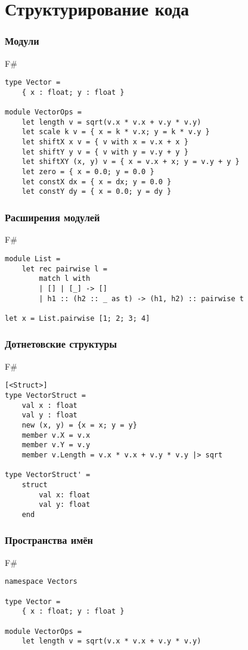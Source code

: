 \documentclass[xetex,mathserif,serif]{beamer}
\begin{document}
	\section{Структурирование кода}

	\begin{frame}[fragile]
		\frametitle{Модули}
		\begin{exampleblock}{F\#}
			\begin{verbatim}
type Vector =
    { x : float; y : float }

module VectorOps =
    let length v = sqrt(v.x * v.x + v.y * v.y)
    let scale k v = { x = k * v.x; y = k * v.y }
    let shiftX x v = { v with x = v.x + x }
    let shiftY y v = { v with y = v.y + y }
    let shiftXY (x, y) v = { x = v.x + x; y = v.y + y }
    let zero = { x = 0.0; y = 0.0 }
    let constX dx = { x = dx; y = 0.0 }
    let constY dy = { x = 0.0; y = dy }
			\end{verbatim}
		\end{exampleblock}
\end{frame}

	\begin{frame}[fragile]
		\frametitle{Расширения модулей}
		\begin{exampleblock}{F\#}
			\begin{verbatim}
module List =
    let rec pairwise l =
        match l with
        | [] | [_] -> []
        | h1 :: (h2 :: _ as t) -> (h1, h2) :: pairwise t

let x = List.pairwise [1; 2; 3; 4]
			\end{verbatim}
		\end{exampleblock}
\end{frame}

	\begin{frame}[fragile]
		\frametitle{Дотнетовские структуры}
		\begin{exampleblock}{F\#}
			\begin{verbatim}
[<Struct>]
type VectorStruct =
    val x : float
    val y : float
    new (x, y) = {x = x; y = y}
    member v.X = v.x
    member v.Y = v.y
    member v.Length = v.x * v.x + v.y * v.y |> sqrt

type VectorStruct' =
    struct
        val x: float
        val y: float
    end
			\end{verbatim}
		\end{exampleblock}
\end{frame}

	\begin{frame}[fragile]
		\frametitle{Пространства имён}
		\begin{exampleblock}{F\#}
			\begin{verbatim}
namespace Vectors

type Vector =
    { x : float; y : float }

module VectorOps =
    let length v = sqrt(v.x * v.x + v.y * v.y)
			\end{verbatim}
		\end{exampleblock}
\end{frame}
\end{document}
